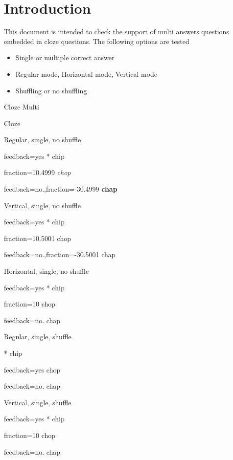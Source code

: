 \documentclass{article}
\begin{document}
\section*{Introduction}

This document is intended to check the support of multi answers questions 
embedded in cloze questions. The following options are tested
\begin{itemize}
	\item Single or multiple correct answer
	\item Regular mode, Horizontal mode, Vertical mode
	\item Shuffling or no shuffling
\end{itemize}

\begin{quiz}{Cloze Multi}

\begin{cloze}{Cloze}
\begin{multi}[shuffle=false]
Regular, single, no shuffle
\item[feedback={yes}]* chip 
\item[fraction=10.4999] \textit{chop} 
\item[feedback={no.},fraction=-30.4999] \textbf{chap}
\end{multi}

\begin{multi}[shuffle=false,vertical]
Vertical, single, no shuffle
\item[feedback={yes}]* chip
\item[fraction=10.5001] chop
\item[feedback={no.},fraction=-30.5001] chap
\end{multi}

\begin{multi}[shuffle=false,horizontal]
Horizontal, single, no shuffle
\item[feedback={yes}]* chip
\item[fraction=10] chop
\item[feedback={no.}] chap
\end{multi}

\begin{multi}[shuffle=true]
	Regular, single, shuffle
	\item[]* chip
	\item[feedback={yes}] chop
	\item[feedback={no.}] chap
\end{multi}

\begin{multi}[shuffle=true,vertical]
	Vertical, single, shuffle
	\item[feedback={yes}]* chip
	\item[fraction=10] chop
	\item[feedback={no.}] chap
\end{multi}


\end{cloze}
\end{quiz}
\end{document}
